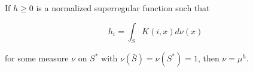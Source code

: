 If $h \geq 0$ is a normalized superregular function such that

$$h_i = \int_S K(i,x) d\nu(x)$$

for some measure $\nu$ on $S^*$ with $\nu(\bar{S}) = \nu(S^*) = 1$, then $\nu = \mu^h$.
